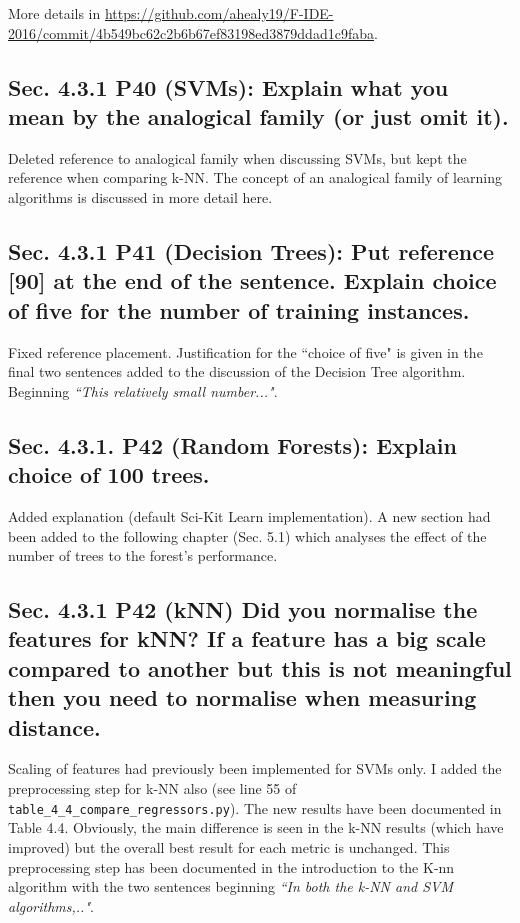 \documentclass[]{article}
\begin{document}
\sloppypar
More details in \url{https://github.com/ahealy19/F-IDE-2016/commit/4b549bc62c2b6b67ef83198ed3879ddad1c9faba}. 

\subsection{Sec. 4.3.1 P40 (SVMs): Explain what you mean by the analogical family (or just omit it).}

Deleted reference to analogical family when discussing SVMs, but kept the reference when comparing k-NN. 
The concept of an analogical family of learning algorithms is discussed in more detail here.

\subsection{Sec. 4.3.1 P41 (Decision Trees): Put reference [90] at the end of the sentence. Explain choice of five for the number of training instances.}

Fixed reference placement. Justification for the ``choice of five" is given in the final two sentences added to the discussion of the Decision Tree algorithm. Beginning \emph{``This relatively small number..."}. 

\subsection{Sec. 4.3.1. P42 (Random Forests): Explain choice of 100 trees.} 
	
Added explanation (default Sci-Kit Learn implementation).
A new section had been added to the following chapter (Sec. 5.1) which analyses the effect of the number of trees to the forest's performance.	
	
\subsection{Sec. 4.3.1 P42 (kNN) Did you normalise the features for kNN? If a feature has a big scale compared to another but this is not meaningful then you need to normalise when measuring distance.}

Scaling of features had previously been implemented for SVMs only. I added the preprocessing step for k-NN also (see line 55 of \texttt{table\_4\_4\_compare\_regressors.py}). 
The new results have been documented in Table 4.4. 
Obviously, the main difference is seen in the k-NN results (which have improved) but the overall best result for each metric is unchanged.
This preprocessing step has been documented in the introduction to the K-nn algorithm with the two sentences beginning \emph{``In both the k-NN and SVM algorithms,.."}. 
\end{document}
